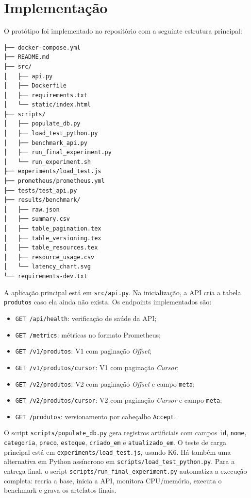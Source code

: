 \documentclass[journal]{IEEEtran}
\begin{document}
\section{Implementação}

O protótipo foi implementado no repositório com a seguinte estrutura principal:

\begin{verbatim}
├── docker-compose.yml
├── README.md
├── src/
│   ├── api.py
│   ├── Dockerfile
│   ├── requirements.txt
│   └── static/index.html
├── scripts/
│   ├── populate_db.py
│   ├── load_test_python.py
│   ├── benchmark_api.py
│   ├── run_final_experiment.py
│   └── run_experiment.sh
├── experiments/load_test.js
├── prometheus/prometheus.yml
├── tests/test_api.py
├── results/benchmark/
│   ├── raw.json
│   ├── summary.csv
│   ├── table_pagination.tex
│   ├── table_versioning.tex
│   ├── table_resources.tex
│   ├── resource_usage.csv
│   └── latency_chart.svg
└── requirements-dev.txt
\end{verbatim}

A aplicação principal está em \texttt{src/api.py}. Na inicialização, a API cria a tabela \texttt{produtos} caso ela ainda não exista. Os endpoints implementados são:

\begin{itemize}
    \item \texttt{GET /api/health}: verificação de saúde da API;
    \item \texttt{GET /metrics}: métricas no formato Prometheus;
    \item \texttt{GET /v1/produtos}: V1 com paginação \textit{Offset};
    \item \texttt{GET /v1/produtos/cursor}: V1 com paginação \textit{Cursor};
    \item \texttt{GET /v2/produtos}: V2 com paginação \textit{Offset} e campo \texttt{meta};
    \item \texttt{GET /v2/produtos/cursor}: V2 com paginação \textit{Cursor} e campo \texttt{meta};
    \item \texttt{GET /produtos}: versionamento por cabeçalho \texttt{Accept}.
\end{itemize}

O script \texttt{scripts/populate\_db.py} gera registros artificiais com campos \texttt{id}, \texttt{nome}, \texttt{categoria}, \texttt{preco}, \texttt{estoque}, \texttt{criado\_em} e \texttt{atualizado\_em}. O teste de carga principal está em \texttt{experiments/load\_test.js}, usando K6. Há também uma alternativa em Python assíncrono em \texttt{scripts/load\_test\_python.py}. Para a entrega final, o script \texttt{scripts/run\_final\_experiment.py} automatiza a execução completa: recria a base, inicia a API, monitora CPU/memória, executa o benchmark e grava os artefatos finais.
\end{document}
